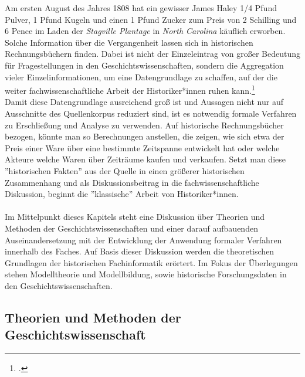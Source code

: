 \documentclass[12pt,a4paper]{article}
\begin{document}
Am ersten August des Jahres 1808 hat ein gewisser James Haley 1/4 Pfund Pulver, 1 Pfund Kugeln und einen 1 Pfund Zucker zum Preis von 2 Schilling und 6 Pence im Laden der \textit{Stagville Plantage} in \textit{North Carolina} käuflich erworben. Solche Information über die Vergangenheit lassen sich in historischen Rechnungsbüchern finden. Dabei ist nicht der Einzeleintrag von großer Bedeutung für Fragestellungen in den Geschichtswissenschaften, sondern die Aggregation vieler Einzelinformationen, um eine Datengrundlage zu schaffen, auf der die weiter fachwissenschaftliche Arbeit der Historiker*innen ruhen kann.\footcite[][06.06.2019]{vogeler2015mittelalterliche}
\\
Damit diese Datengrundlage ausreichend groß ist und Aussagen nicht nur auf Ausschnitte des Quellenkorpus reduziert sind, ist es notwendig formale Verfahren zu Erschließung und Analyse zu verwenden. Auf historische Rechnungsbücher bezogen, könnte man so Berechnungen anstellen, die zeigen, wie sich etwa der Preis einer Ware über eine bestimmte Zeitspanne entwickelt hat oder welche Akteure welche Waren über Zeiträume kaufen und verkaufen.  Setzt man diese ''historischen Fakten'' aus der Quelle in einen größerer historischen Zusammenhang und als Diskussionsbeitrag in die fachwissenschaftliche Diskussion, beginnt die ''klassische'' Arbeit von Historiker*innen.
\\
\\
Im Mittelpunkt dieses Kapitels steht eine Diskussion über Theorien und Methoden der Geschichtswissenschaften und einer darauf aufbauenden Auseinandersetzung mit der Entwicklung der Anwendung formaler Verfahren innerhalb des Faches. Auf Basis dieser Diskussion werden die theoretischen Grundlagen der historischen Fachinformatik erörtert. Im Fokus der Überlegungen stehen Modelltheorie und Modellbildung, sowie historische Forschungsdaten in den Geschichtswissenschaften.

\subsection{Theorien und Methoden der Geschichtswissenschaft}
\end{document}
